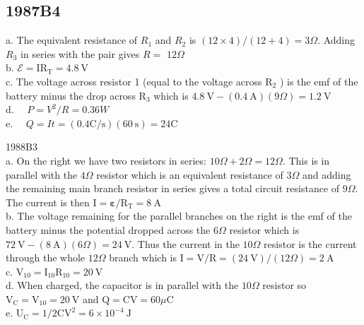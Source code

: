 \begin{enumerate}
\section*{1987B4}
a. The equivalent resistance of $R_{1}$ and $R_{2}$ is $(12 \times 4) /(12+4)=3 \Omega$. Adding $R_{3}$ in series with the pair gives $R=$ $12 \Omega$\\
b. $\boldsymbol{\mathcal { E }}=\mathrm{IR}_{\mathrm{T}}=4.8 \mathrm{~V}$\\
c. The voltage across resistor 1 (equal to the voltage across $\mathrm{R}_{2}$ ) is the emf of the battery minus the drop across $\mathrm{R}_{3}$ which is $4.8 \mathrm{~V}-(0.4 \mathrm{~A})(9 \Omega)=1.2 \mathrm{~V}$\\
d. $\quad P=V^{2} / R=0.36 W$\\
e. $\quad Q=I t=(0.4 \mathrm{C} / \mathrm{s})(60 \mathrm{~s})=24 \mathrm{C}$

1988B3\\
a. On the right we have two resistors in series: $10 \Omega+2 \Omega=12 \Omega$. This is in parallel with the $4 \Omega$ resistor which is an equivalent resistance of $3 \Omega$ and adding the remaining main branch resistor in series gives a total circuit resistance of $9 \Omega$. The current is then $\mathrm{I}=\boldsymbol{\varepsilon} / \mathrm{R}_{\mathrm{T}}=8 \mathrm{~A}$\\
b. The voltage remaining for the parallel branches on the right is the emf of the battery minus the potential dropped across the $6 \Omega$ resistor which is $72 \mathrm{~V}-(8 \mathrm{~A})(6 \Omega)=24 \mathrm{~V}$. Thus the current in the $10 \Omega$ resistor is the current through the whole $12 \Omega$ branch which is $\mathrm{I}=\mathrm{V} / \mathrm{R}=(24 \mathrm{~V}) /(12 \Omega)=2 \mathrm{~A}$\\
c. $\mathrm{V}_{10}=\mathrm{I}_{10} \mathrm{R}_{10}=20 \mathrm{~V}$\\
d. When charged, the capacitor is in parallel with the $10 \Omega$ resistor so $\mathrm{V}_{\mathrm{C}}=\mathrm{V}_{10}=20 \mathrm{~V}$ and $\mathrm{Q}=\mathrm{CV}=60 \mu \mathrm{C}$\\
e. $\mathrm{U}_{\mathrm{C}}=1 / 2 \mathrm{CV}^{2}=6 \times 10^{-4} \mathrm{~J}$


\end{enumerate}
